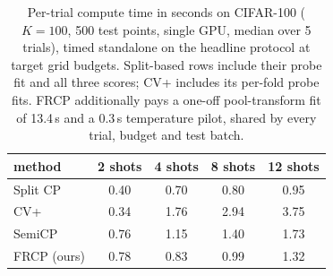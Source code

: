 \begin{table}[t]
\centering
\small
\setlength{\tabcolsep}{5pt}
\caption{Per-trial compute time in seconds on CIFAR-100 ($K=100$, 500 test points, single GPU, median over 5 trials), timed standalone on the headline protocol at target grid budgets. Split-based rows include their probe fit and all three scores; CV+ includes its per-fold probe fits. FRCP additionally pays a one-off pool-transform fit of 13.4\,s and a 0.3\,s temperature pilot, shared by every trial, budget and test batch.}
\label{tab:runtime-cifar100}
\begin{tabular}{lcccc}
\toprule
method & 2 shots & 4 shots & 8 shots & 12 shots\\
\midrule
Split CP & 0.40 & 0.70 & 0.80 & 0.95\\
CV+ & 0.34 & 1.76 & 2.94 & 3.75\\
SemiCP & 0.76 & 1.15 & 1.40 & 1.73\\
FRCP (ours) & 0.78 & 0.83 & 0.99 & 1.32\\
\bottomrule
\end{tabular}
\end{table}
